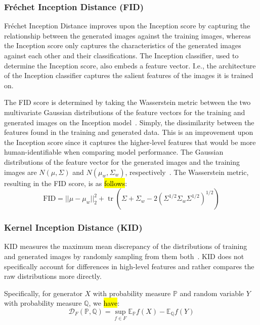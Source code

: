 \documentclass[technologies,article,accept,pdftex,moreauthors]{Definitions/mdpi}
\begin{document}
\subsubsection{Fréchet Inception Distance (FID)}
Fréchet Inception Distance improves upon the Inception score by capturing the relationship between the generated images against the training images, whereas the Inception score only captures the characteristics of the generated images against each other and their classifications. The Inception classifier, used to determine the Inception score, also embeds a feature vector. I.e., the architecture of the Inception classifier captures the salient features of the images it is trained on.



The FID score is determined by taking the Wasserstein metric between the two multivariate Gaussian distributions of the feature vectors for the training and generated images on the Inception model~\cite{NIPS2017_8a1d6947}. Simply, the dissimilarity between the features found in the training and generated data. This is an improvement upon the Inception score since it captures the higher-level features that would be more human-identifiable when comparing model performance. The Gaussian distributions of the feature vector for the generated images and the training images are $N(\mu, \Sigma)$ and $N(\mu_w, \Sigma_w)$, respectively~\cite{NIPS2017_8a1d6947}. The Wasserstein metric, resulting in the FID score, is as \hl{follows}:
\begin{equation}
\text{FID}=||\mu -\mu _{w}||_{2}^{2}+\operatorname {tr} (\Sigma +\Sigma _{w}-2(\Sigma ^{1/2}\Sigma _{w}\Sigma ^{1/2})^{1/2})
\end{equation}


\subsubsection{Kernel Inception Distance (KID)}
KID measures the maximum mean discrepancy of the distributions of training and generated images by randomly sampling from them both~\cite{MMD_KID}. KID does not specifically account for differences in high-level features and rather compares the raw distributions more directly.


Specifically, for generator $X$ with probability measure $\mathbb{P}$ and random variable $Y$ with probability measure $\mathbb{Q}$, we \hl{have}:
\begin{equation}
\mathcal{D}_F(\mathbb{P},\mathbb{Q}) = \sup_{f\in F}\mathbb{E}_\mathbb{P}f(X) - \mathbb{E}_\mathbb{Q}f(Y) 
\end{equation}
\end{document}
